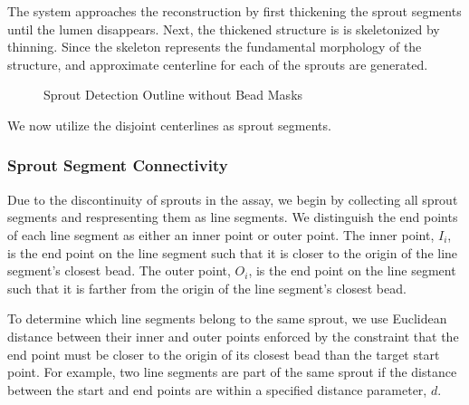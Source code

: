 \documentclass{sig-alternate}
\begin{document}
		The system approaches the reconstruction by first thickening the
		sprout segments until the lumen disappears. Next, the thickened
		structure is is skeletonized by thinning. Since the skeleton
		represents the fundamental morphology of the structure, and
		approximate centerline for each of the sprouts are generated.
		\begin{figure}[htp!]
			\centering
			\caption{Sprout Detection Outline without Bead Masks}
			\label{fig:sproutex}
		\end{figure}
		We now utilize the disjoint centerlines as sprout segments.
		
		\subsubsection{Sprout Segment Connectivity} %
		\label{ssub:Sprout Segment Connectivity}
			Due to the discontinuity of sprouts in the assay, we begin by
			collecting all sprout segments and respresenting them as line
			segments. We distinguish the end points of each line segment
			as either an inner point or outer point. The inner point, $I_i$,
			is the end point on the line segment such that it is closer to
			the origin of the line segment's closest bead. The outer
			point, $O_i$, is the end point on the line segment such that it
			is farther from the origin of the line segment's closest bead.

			To determine which line segments belong to the same sprout, we
			use Euclidean distance between their inner and outer points
			enforced by the constraint that the end point must be closer
			to the origin of its closest bead than the target start point.
			For example, two line segments are part of the same sprout if
			the distance between the start and end points are within a
			specified distance parameter, $d$.
\end{document}
